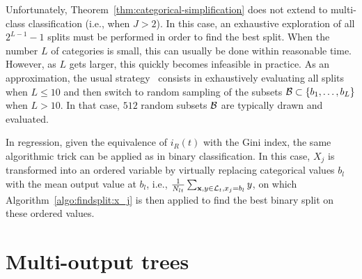 Unfortunately, Theorem~\ref{thm:categorical-simplification} does not extend to
multi-class classification (i.e., when $J > 2$). In this case, an exhaustive
exploration of all $2^{L-1}-1$ splits must be performed in order
to find the best split.  When the number $L$ of categories is small, this can
usually be done  within reasonable time. However, as $L$ gets larger, this
quickly becomes infeasible in practice. As an approximation, the usual
strategy~\citep{liaw:2002} consists in exhaustively evaluating all splits when
$L \leq 10$ and then switch to random sampling of the subsets ${\cal B} \subset
\{ b_1, \dots, b_L \}$ when $L > 10$. In that case, $512$ random subsets ${\cal
B}$ are typically drawn and evaluated.

In regression, given the equivalence of $i_R(t)$ with the Gini index, the same
algorithmic trick can be applied as in binary classification. In this case,
$X_j$ is transformed into an ordered variable by virtually replacing
categorical values $b_l$ with the mean output value at $b_l$, i.e.,
$\tfrac{1}{N_{lt}} \sum_{\mathbf{x}, y \in {\cal L}_t, x_j = b_l} y$, on which
Algorithm~\ref{algo:findsplit:x_j} is then applied to find the best binary
split on these ordered values.


\section{Multi-output trees}

\todo{}


